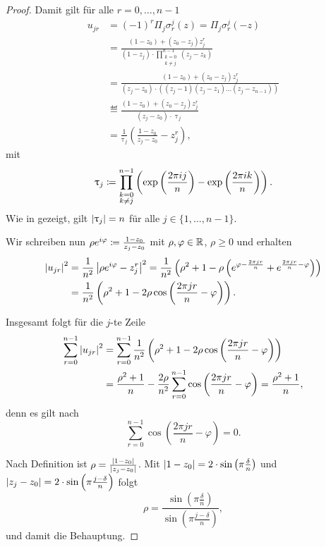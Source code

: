 \begin{proof}
    \noindent Damit gilt für alle $r=0, \dots, n-1$
    \[
        \begin{split}
            u_{jr}
            &= (-1)^r \Pi_j \sigma_r^j(z)
            = \Pi_j \sigma_r^j(-z) \\
            &= \frac{(1 - z_0) + (z_0 - z_j) z_j^r}{(1-z_j) \cdot \prod_{\substack{k=0\\ k\neq j}}^{n-1} (z_j - z_k)}\\
            &= \frac{(1 - z_0) + (z_0 - z_j) z_j^r}{(z_j-z_0) \cdot \left((z_j - 1) (z_j - z_1) \dots (z_j - z_{n-1}) \right)}\\
            &\eqdef \frac{(1 - z_0) + (z_0 - z_j) z_j^r}{(z_j-z_0) \cdot \uptau_j }\\
            &= \frac{1}{\uptau_j} \left( \frac{1 - z_0}{z_j-z_0} - z_j^r \right),
        \end{split}
    \]
    mit
    \[
        \uptau_j \coloneqq \prod_{\substack{k=0\\k\neq j}}^{n-1} \left( \exp\left(\frac{2 \pi i j}{n}\right) - \exp\left(\frac{2 \pi i k}{n}\right) \right).
    \]
    Wie in  gezeigt, gilt $\left\lvert \uptau_j \right\rvert = n$ für alle $j \in \{1, \dots, n-1\}$.

    \noindent Wir schreiben nun $ \rho e^{i\varphi} \coloneqq \frac{1-z_0}{z_j-z_0} $
    mit $\rho, \varphi \in \mathbb{R}$, $\rho \geq 0$ und erhalten
    \[
        \begin{split}
            \left\lvert u_{jr} \right\rvert^2
            &= \frac{1}{n^2} \left\lvert  \rho e^{i\varphi} - z_j^r  \right\rvert^2
            = \frac{1}{n^2} \left( \rho^2 + 1 - \rho \left( e^{\varphi - \frac{2\pi j r}{n}} + e^{\frac{2 \pi j r } {n} - \varphi} \right) \right)\\
            &= \frac{1}{n^2} \left( \rho^2 + 1 - 2 \rho \cos \left( \frac{2 \pi j r}{n} - \varphi \right) \right).
        \end{split}
    \]

    \noindent Insgesamt folgt für die $j$-te Zeile
    \[
        \begin{split}
            \sum_{r=0}^{n-1} \left\lvert u_{jr} \right\rvert^2
            &= \sum_{r=0}^{n-1} \frac{1}{n^2} \left( \rho^2 + 1 - 2 \rho \cos \left( \frac{2 \pi j r}{n} - \varphi \right) \right)\\
            &= \frac{\rho^2 + 1}{n} - \frac{2 \rho}{n^2} \sum_{r=0}^{n-1} \cos \left( \frac{2 \pi j r}{n} - \varphi \right)
            = \frac{\rho^2 + 1}{n},
        \end{split}
    \]
    denn es gilt nach 
    \[
        \sum_{r=0}^{n-1} \cos \left( \frac{2 \pi j r}{n} - \varphi \right) = 0.
    \]

    \noindent Nach Definition ist $\rho = \frac{\left\lvert  1 - z_0 \right\rvert}{\left\lvert z_j - z_0 \right\rvert}$.
    Mit
    $\left\lvert 1-z_0 \right\rvert = 2 \cdot \sin \left( \pi \frac{\delta}{n} \right)$
    und
    $\left\lvert z_j-z_0 \right\rvert = 2 \cdot \sin \left( \pi \frac{j - \delta}{n} \right)$
    folgt
    \[
        \rho = \frac{\sin \left( \pi \frac{\delta}{n} \right)}{\sin \left( \pi \frac{j - \delta}{n} \right)},
    \]
    und damit die Behauptung.
\end{proof}

